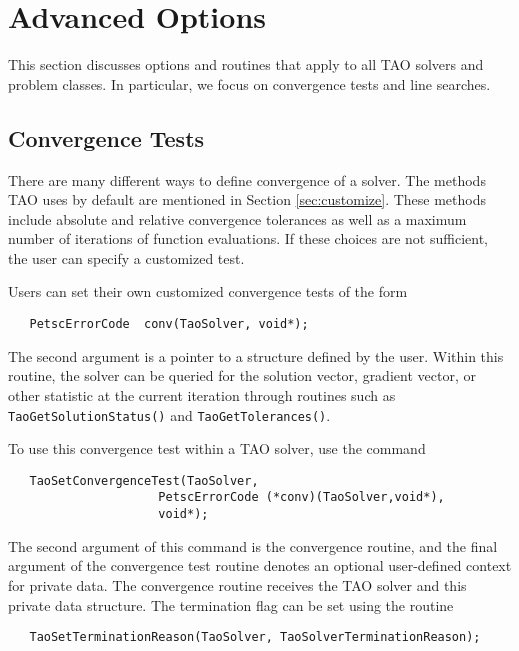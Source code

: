 
\chapter{Advanced Options}

This section discusses options and routines that apply to all TAO
solvers and problem classes.  In particular, we focus on
convergence tests and line searches.



\section{Convergence Tests}
\label{sec:Taoconvergence}

There are many different ways to define convergence of a solver.
The methods TAO uses by default are mentioned in 
Section \ref{sec:customize}.
These methods include absolute and relative convergence tolerances as well
as a maximum number of iterations of function evaluations.
If these choices are not sufficient, 
the user can specify a customized test. 

Users can set their own customized convergence tests of the form
\begin{verbatim}
   PetscErrorCode  conv(TaoSolver, void*);
\end{verbatim}
\noindent
The second argument is a pointer to a structure defined by the user.
Within this routine, the solver
can be queried for the solution vector, gradient vector,
or other statistic at the current iteration through routines such as
{\tt TaoGetSolutionStatus()} and  {\tt TaoGetTolerances()}.

To use this convergence test within a TAO solver, use
the command 
\begin{verbatim}
   TaoSetConvergenceTest(TaoSolver,
                     PetscErrorCode (*conv)(TaoSolver,void*),
                     void*);
\end{verbatim}
\noindent
The second argument of this command is the convergence routine, and the
final argument of the convergence test routine denotes an optional 
user-defined context for private data.  
The convergence routine receives the TAO solver and this private data
structure. 
The termination flag can be set using the routine
\begin{verbatim}
   TaoSetTerminationReason(TaoSolver, TaoSolverTerminationReason);
\end{verbatim}
\noindent




